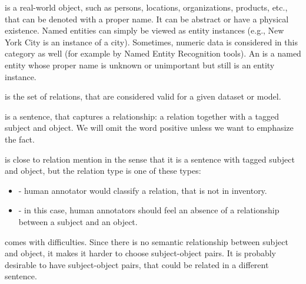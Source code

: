    is a real-world object, such as persons, locations, organizations, products, etc., that can be denoted with a proper name. It can be abstract or have a physical existence. Named entities can simply be viewed as entity instances (e.g., New York City is an instance of a city). Sometimes, numeric data is considered in this category as well (for example by Named Entity Recognition tools). An  is a named entity whose proper name is unknown or unimportant but still is an entity instance. 

 is the set of relations, that are considered valid for a given dataset or model.

 is a sentence, that captures a relationship: a relation together with a tagged subject and object. We will omit the word positive unless we want to emphasize the fact.

 is close to relation mention in the sense that it is a sentence with tagged subject and object, but the relation type is one of these types: 
\begin{itemize}
\item {} - human annotator would classify a relation, that is not in inventory.
\item {} - in this case, human annotators should feel an absence of a relationship between a subject and an object. 



\end{itemize}

 comes with difficulties. Since there is no semantic relationship between subject and object, it makes it harder to choose subject-object pairs. It is probably desirable to have subject-object pairs, that could be related in a different sentence.

 

 


